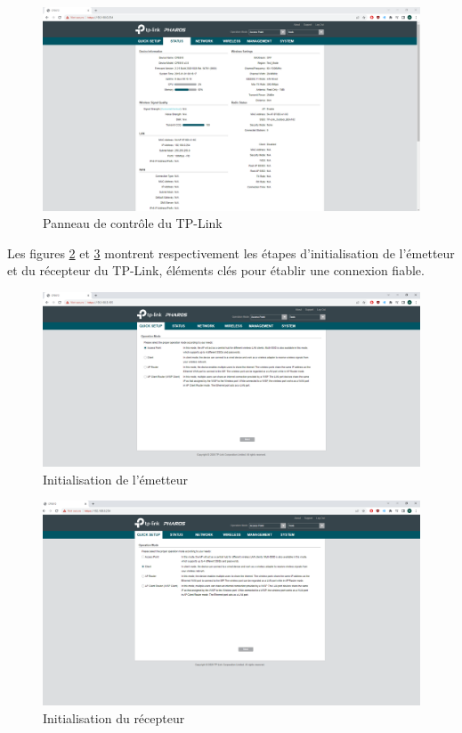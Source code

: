 \begin{figure}[H]
\centering
\includegraphics[width=15cm]{Images/tplink34.png}
\caption{Panneau de contrôle du TP-Link}
\label{Chap2.3.7}
\end{figure}

Les figures \ref{Chap2.3.8} et \ref{Chap2.3.9} montrent respectivement les étapes d'initialisation de l'émetteur et du récepteur du TP-Link, éléments clés pour établir une connexion fiable.

\begin{figure}[H]
\centering
\includegraphics[width=15cm]{Images/tplink35.png}
\caption{Initialisation de l'émetteur}
\label{Chap2.3.8}
\end{figure}

\begin{figure}[H]
\centering
\includegraphics[width=15cm]{Images/tplink36.png}
\caption{Initialisation du récepteur}
\label{Chap2.3.9}
\end{figure}

